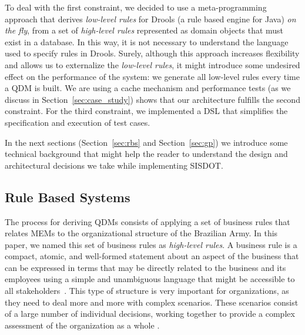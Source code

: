 \documentclass{bmcart}
\newcommand{\callers}{\emph{high-level rules}\xspace}
\begin{document}
To deal with the first constraint, we decided to use a meta-programming approach that derives \emph{low-level rules} for Drools (a rule based engine for Java) \emph{on the fly}, from a set of \callers represented as domain objects that must exist in a database. In this way, it is not necessary to understand the language used to specify rules in Drools. Surely, although this approach increases flexibility and allows us to externalize the \emph{low-level rules}, it might introduce some undesired effect on the performance of the system: we generate all low-level rules every time a QDM is built. We are using a cache mechanism and performance tests (as we discuss in Section~\ref{sec:case_study}) shows that our architecture fulfills the second constraint. For the third constraint, we implemented a DSL that simplifies the specification and execution of test cases. 

In the next sections (Section~\ref{sec:rbs} and Section~\ref{sec:gp}) we introduce some technical background that might help the reader to understand the design and architectural decisions we take while implementing SISDOT.  




\subsection*{Rule Based Systems}
\label{sec:rbs}
The process for deriving QDMs consists of applying a set of business rules that relates MEMs to the organizational structure of the Brazilian Army. In this paper, we named this set of business rules as \callers. A business rule is a compact, atomic, and well-formed statement about an aspect of the business that can be expressed in terms that may be directly related to the business and its employees using a simple and unambiguous language that might be accessible to all stakeholders~\cite{graham2007business}. This type of structure is very important for organizations, as they need to deal more and more with complex scenarios. These scenarios consist of a large number of individual decisions, working together to provide a complex assessment of the organization as a whole \cite{salatino2016mastering}.
\end{document}
